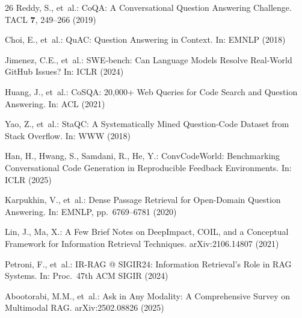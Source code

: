 \documentclass[runningheads]{llncs}
\begin{document}
\begin{thebibliography}{26}
Reddy, S., et~al.: CoQA: A Conversational Question Answering
Challenge. TACL \textbf{7}, 249--266 (2019)

Choi, E., et~al.: QuAC: Question Answering in Context.
In: EMNLP (2018)

Jimenez, C.E., et~al.: SWE-bench: Can Language Models Resolve
Real-World GitHub Issues? In: ICLR (2024)

Huang, J., et~al.: CoSQA: 20,000+ Web Queries for Code Search
and Question Answering. In: ACL (2021)

Yao, Z., et~al.: StaQC: A Systematically Mined
Question-Code Dataset from Stack Overflow. In: WWW (2018)

Han, H., Hwang, S., Samdani, R., He, Y.: ConvCodeWorld:
Benchmarking Conversational Code Generation in Reproducible
Feedback Environments. In: ICLR (2025)

Karpukhin, V., et~al.: Dense Passage Retrieval for Open-Domain
Question Answering. In: EMNLP, pp.\ 6769--6781 (2020)

Lin, J., Ma, X.: A Few Brief Notes on DeepImpact, COIL, and a
Conceptual Framework for Information Retrieval Techniques.
arXiv:2106.14807 (2021)

Petroni, F., et~al.: IR-RAG @ SIGIR24: Information Retrieval's
Role in RAG Systems. In: Proc.\ 47th ACM SIGIR (2024)

Abootorabi, M.M., et~al.: Ask in Any Modality: A Comprehensive
Survey on Multimodal RAG. arXiv:2502.08826 (2025)

\end{thebibliography}
\end{document}
